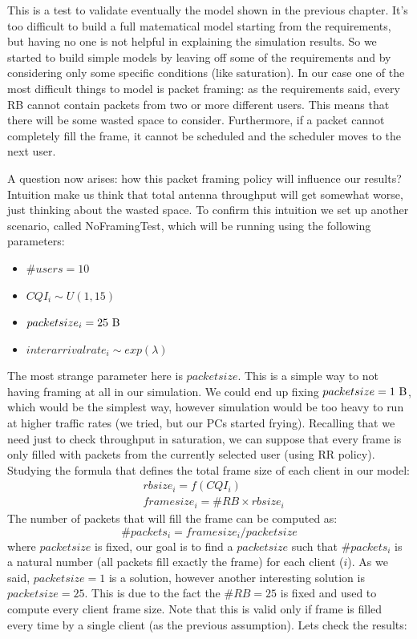This is a test to validate eventually the model shown in the previous chapter. It's too difficult to build a full matematical model starting from the requirements, but having no one is not helpful in explaining the simulation results. So we started to build simple models by leaving off some of the requirements and by considering only some specific conditions (like saturation). In our case one of the most difficult things to model is packet framing: as the requirements said, every RB cannot contain packets from two or more different users. This means that there will be some wasted space to consider. Furthermore, if a packet cannot completely fill the frame, it cannot be scheduled and the scheduler moves to the next user.

A question now arises: how this packet framing policy will influence our results? Intuition make us think that total antenna throughput will get somewhat worse, just thinking about the wasted space.
To confirm this intuition we set up another scenario, called NoFramingTest, which will be running using the following parameters:

\begin{itemize}
	\item \(\#users = 10\)
	\item \(CQI_i \sim U(1,15)\)
	\item \(packetsize_i=25 \textnormal{ B}\)
	\item \(interarrivalrate_i \sim exp(\lambda)\)
\end{itemize}

The most strange parameter here is \(packetsize\). This is a simple way to not having framing at all in our simulation. We could end up fixing \(packetsize=1 \textnormal{ B}\), which would be the simplest way, however simulation would be too heavy to run at higher traffic rates (we tried, but our PCs started frying). Recalling that we need just to check throughput in saturation, we can suppose that every frame is only filled with packets from the currently selected user (using RR policy).
Studying the formula that defines the total frame size of each client in our model:
\begin{equation}
	\begin{split}
	&rbsize_i = f(CQI_i) \\
	&framesize_i = \#RB \times rbsize_i
	\end{split}
\end{equation}
The number of packets that will fill the frame can be computed as:
\begin{equation}
\#packets_i = framesize_i/packetsize
\end{equation}
where \(packetsize\) is fixed, our goal is to find a \(packetsize\) such that \(\#packets_i\) is a natural number (all packets fill exactly the frame) for each client (\(i\)).
As we said, \(packetsize=1\) is a solution, however another interesting solution is \(packetsize=25\). This is due to the fact the \(\#RB=25\) is fixed and used to compute every client frame size. Note that this is valid only if frame is filled every time by a single client (as the previous assumption). Lets check the results:

